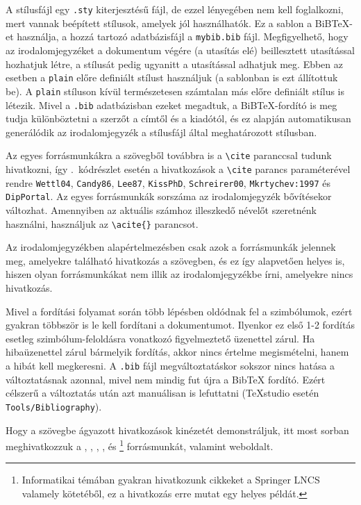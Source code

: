 A stílusfájl egy \verb+.sty+ kiterjesztésű fájl, de ezzel lényegében nem kell foglalkozni, mert vannak beépített stílusok, amelyek jól használhatók. Ez a sablon a BiB\TeX-et használja, a hozzá tartozó adatbázisfájl a \verb+mybib.bib+ fájl. Megfigyelhető, hogy az irodalomjegyzéket a dokumentum végére (a \verb++ utasítás elé) beillesztett \verb++ utasítással hozhatjuk létre, a stílusát pedig ugyanitt a  \verb++ utasítással adhatjuk meg. Ebben az esetben a \verb+plain+ előre definiált stílust használjuk (a sablonban is ezt állítottuk be). A \verb+plain+ stíluson kívül természetesen számtalan más előre definiált stílus is létezik. Mivel a \verb+.bib+ adatbázisban ezeket megadtuk, a BiB\TeX-fordító is meg tudja különböztetni a szerzőt a címtől és a kiadótól, és ez alapján automatikusan generálódik az irodalomjegyzék a stílusfájl által meghatározott stílusban.

Az egyes forrásmunkákra a szövegből továbbra is a \verb+\cite+ paranccsal tudunk hivatkozni, így .~kódrészlet esetén a hivatkozások a \verb+\cite+ parancs paraméterével rendre \texttt{Wettl04}, \texttt{Candy86}, \texttt{Lee87}, \texttt{KissPhD}, \texttt{Schreirer00}, \texttt{Mkrtychev:1997} és \texttt{DipPortal}. Az egyes forrásmunkák sorszáma az irodalomjegyzék bővítésekor változhat. Amennyiben az aktuális számhoz illeszkedő névelőt szeretnénk használni, használjuk az \verb+\acite{}+ parancsot.

Az irodalomjegyzékben alapértelmezésben csak azok a forrásmunkák jelennek meg, amelyekre található hivatkozás a szövegben, és ez így alapvetően helyes is, hiszen olyan forrásmunkákat nem illik az irodalomjegyzékbe írni, amelyekre nincs hivatkozás.

Mivel a fordítási folyamat során több lépésben oldódnak fel a szimbólumok, ezért gyakran többször is le kell fordítani a dokumentumot. Ilyenkor ez első 1-2 fordítás esetleg szimbólum-feloldásra vonatkozó figyelmeztető üzenettel zárul. Ha hibaüzenettel zárul bármelyik fordítás, akkor nincs értelme megismételni, hanem a hibát kell megkeresni. A \verb+.bib+ fájl megváltoztatáskor sokszor nincs hatása a változtatásnak azonnal, mivel nem mindig fut újra a BibTeX fordító. Ezért célszerű a változtatás után azt manuálisan is lefuttatni (TeXstudio esetén \verb+Tools/Bibliography+).

Hogy a szövegbe ágyazott hivatkozások kinézetét demonstráljuk, itt most sorban meghivatkozzuk a \cite{Wettl04}, \cite{Candy86}, \cite{Lee87}, \cite{KissPhD}, \cite{Schreier00} és \footnote{Informatikai témában gyakran hivatkozunk cikkeket a Springer LNCS valamely kötetéből, ez a hivatkozás erre mutat egy helyes példát.} forrásmunkát, valamint  weboldalt.

